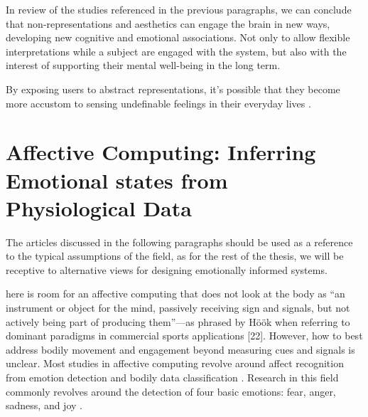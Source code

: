 In review of the studies referenced in the previous paragraphs, we can conclude that non-representations and aesthetics can engage the brain in new ways, developing new cognitive and emotional associations. Not only to allow flexible interpretations while a subject are engaged with the system, but also with the interest of supporting their mental well-being in the long term.

By exposing users to abstract representations, it's possible that they become more accustom to sensing undefinable feelings in their everyday lives \cite{durkin_objective_2020}.



\section{Affective Computing: Inferring Emotional states from Physiological Data}
\label{affective_computng_lit_review}


The articles discussed in the following paragraphs should be used as a reference to the typical assumptions of the field, as for the rest of the thesis, we will be receptive to alternative views for designing emotionally informed systems.

here is room for an affective computing that does not look at the body as “an instrument or object for the mind, passively receiving sign and signals, but not actively being part of producing them”—as phrased by Höök when referring to dominant paradigms in commercial sports applications [22]. However, how to best address bodily movement and engagement beyond measuring cues and signals is unclear. Most studies in affective computing revolve around affect recognition from emotion detection and bodily data classification \cite{bota_review_2019}. Research in this field commonly revolves around the detection of four basic emotions: fear, anger, sadness, and joy \cite{picard_mit_nodate}.


